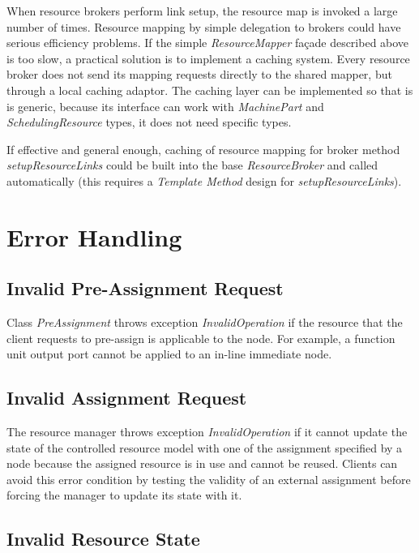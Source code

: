 \documentclass[a4paper,twoside]{tce}
\begin{document}
When resource brokers perform link setup, the resource map is invoked a
large number of times. Resource mapping by simple delegation to brokers
could have serious efficiency problems. If the simple \emph{ResourceMapper}
façade described above is too slow, a practical solution is to implement a
caching system. Every resource broker does not send its mapping requests
directly to the shared mapper, but through a local caching adaptor. The
caching layer can be implemented so that is is generic, because its
interface can work with \emph{MachinePart} and \emph{SchedulingResource}
types, it does not need specific types.

If effective and general enough, caching of resource mapping for broker
method \emph{setupResourceLinks} could be built into the base
\emph{ResourceBroker} and called automatically (this requires a
\emph{Template Method} design for \emph{setupResourceLinks}).

\section{Error Handling}

\subsection{Invalid Pre-Assignment Request}

Class \emph{PreAssignment} throws exception \emph{InvalidOperation} if the
resource that the client requests to pre-assign is applicable to the node.
For example, a function unit output port cannot be applied to an in-line
immediate node.

\subsection{Invalid Assignment Request}
\label{ssec:invalid-ext-assignment}

The resource manager throws exception \emph{InvalidOperation} if it cannot
update the state of the controlled resource model with one of the assignment
specified by a node because the assigned resource is in use and cannot be
reused. Clients can avoid this error condition by testing the validity of an
external assignment before forcing the manager to update its state with it.

\subsection{Invalid Resource State}
\label{ssec:invalid-resource-state}
\end{document}
